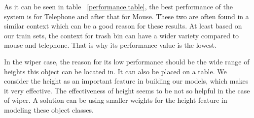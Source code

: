 As it can be seen in table ~\ref{performance.table}, the best performance of the system is for Telephone and after 
that for Mouse.
These two are often found in a similar context which can be a good reason for these results.
At least based on our train sets, the context for trash bin can have a wider variety compared to mouse and telephone.
That is why its performance value is the lowest.


In the wiper case, the reason for its low performance should be the wide range of heights this object can be located in. It can also be placed on a table.
We consider the height as an important feature in building our models, which makes it very effective.
The effectiveness of height seems to be not so helpful in the case of wiper.
A solution can be using smaller weights for the height feature in modeling these object classes.

